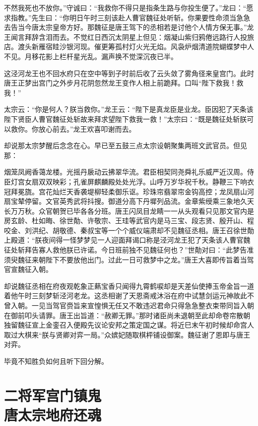 \documentclass[12pt,UTF8]{ctexbook}
\begin{document}
{不然我死也不放你。”守诚曰：“我救你不得只是指条生路与你投生便了。”龙曰：“愿求指教。”先生曰：“你明日午时三刻该赴人曹官魏征处听斩。你果要性命须当急急去告当今唐太宗皇帝方好。那魏征是唐王驾下的丞相若是讨他个人情方保无事。”龙王闻言拜辞含泪而去。不觉红日西沉太阴星上但见：烟凝山紫归鸦倦远路行人投旅店。渡头新雁宿眭沙银河现。催更筹孤村灯火光无焰。风袅炉烟清道院蝴蝶梦中人不见。月移花影上栏杆星光乱。漏声换不觉深沉夜已半。

这泾河龙王也不回水府只在空中等到子时前后收了云头敛了雾角径来皇宫门。此时唐王正梦出宫门之外步月花阴忽然龙王变作人相上前跪拜。口叫“陛下救我！救我！”

太宗云：“你是何人？朕当救你。”龙王云：“陛下是真龙臣是业龙。臣因犯了天条该陛下贤臣人曹官魏征处斩故来拜求望陛下救我一救！”太宗曰：“既是魏征处斩朕可以救你。你放心前去。”龙王欢喜叩谢而去。

却说那太宗梦醒后念念在心。早已至五鼓三点太宗设朝聚集两班文武官员。但见那：

烟笼凤阙香蔼龙楼。光摇丹扆动云拂翠华流。君臣相契同尧舜礼乐威严近汉周。侍臣灯宫女扇双双映彩；孔雀屏麒麟殿处处光浮。山呼万岁华祝千秋。静鞭三下响衣冠拜冕旒。宫花灿烂天香袭堤柳轻柔御乐讴。珍珠帘翡翠帘金钩高控；龙凤扇山河扇宝辇停留。文官英秀武将抖搜。御道分高下丹墀列品流。金章紫绶乘三象地久天长万万秋。众官朝贺已毕各各分班。唐王闪凤目龙睛一一从头观看只见那文官内是房玄龄、杜如晦、徐世勣、许敬宗、王珪等武官内是马三宝、段志贤、殷开山、程咬金、刘洪纪、胡敬德、秦叔宝等一个个威仪端肃却不见魏征丞相。唐王召徐世勣上殿道：“朕夜间得一怪梦梦见一人迎面拜谒口称是泾河龙王犯了天条该人曹官魏征处斩拜告寡人救他朕已许诺。今日班前独不见魏征何也？”世勣对曰：“此梦告准须臾魏征来朝陛下不要放他出门。过此一日可救梦中之龙。”唐王大喜即传旨着当驾官宣魏征入朝。

却说魏征丞相在府夜观乾象正爇宝香只闻得九霄鹤唳却是天差仙使捧玉帝金旨一道着他午时三刻梦斩泾河老龙。这丞相谢了天恩斋戒沐浴在府中试慧剑运元神故此不曾入朝。一见当驾官赍旨来宣惶惧无任又不敢违迟君命只得急急整衣束带同旨入朝在御前叩头请罪。唐王出旨道：“赦卿无罪。”那时诸臣尚未退朝至此却命卷帘散朝独留魏征宣上金銮召入便殿先议论安邦之策定国之谋。将近巳末午初时候却命宫人取过大棋来“朕与贤卿对弈一局。”众嫔妃随取棋枰铺设御案。魏征谢了恩即与唐王对弈。

毕竟不知胜负如何且听下回分解。

\chapter[二将军宫门镇鬼\ 唐太宗地府还魂]{二将军宫门镇鬼\\唐太宗地府还魂}

}
\end{document}
